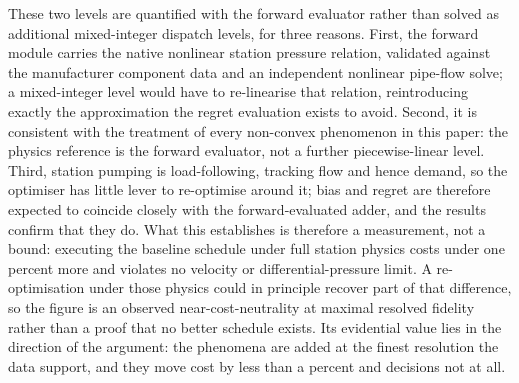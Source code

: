 \documentclass[a4paper,fleqn]{cas-sc}
\begin{document}
These two levels are quantified with the forward evaluator rather than solved as additional
mixed-integer dispatch levels, for three reasons. First, the forward module carries the native
nonlinear station pressure relation, validated against the manufacturer component data and an
independent nonlinear pipe-flow solve; a mixed-integer level would have to re-linearise that
relation, reintroducing exactly the approximation the regret evaluation exists to avoid.
Second, it is consistent with the treatment of every non-convex phenomenon in this paper: the
physics reference is the forward evaluator, not a further piecewise-linear level. Third,
station pumping is load-following, tracking flow and hence demand, so the optimiser has
little lever to re-optimise around it; bias and regret are therefore expected to coincide
closely with the forward-evaluated adder, and the results confirm that they do.
What this establishes is therefore a measurement, not a bound: executing the baseline
schedule under full station physics costs under one percent more and violates no velocity or
differential-pressure limit. A re-optimisation under those physics could in principle recover
part of that difference, so the figure is an observed near-cost-neutrality at maximal
resolved fidelity rather than a proof that no better schedule exists. Its evidential value
lies in the direction of the argument: the phenomena are added at the finest resolution the
data support, and they move cost by less than a percent and decisions not at all.
\end{document}

